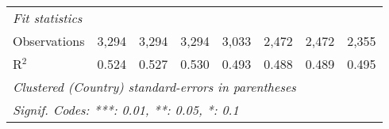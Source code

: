 \begin{tabular}{lccccccc}
   \midrule \emph{Fit statistics}\\
   Observations                                                                  & 3,294        & 3,294        & 3,294         & 3,033        & 2,472          & 2,472          & 2,355\\  
   R$^2$                                                                         & 0.524        & 0.527        & 0.530         & 0.493        & 0.488          & 0.489          & 0.495\\  
   \midrule
   \multicolumn{8}{l}{\emph{Clustered (Country) standard-errors in parentheses}}\\
   \multicolumn{8}{l}{\emph{Signif. Codes: ***: 0.01, **: 0.05, *: 0.1}}\\
\end{tabular}
\par\endgroup


